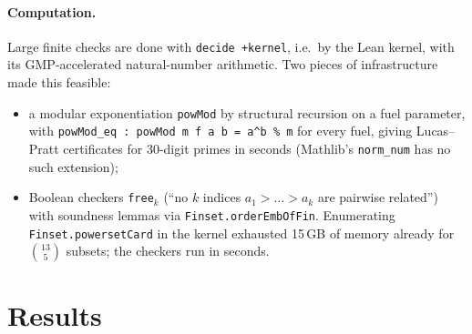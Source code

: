 \documentclass[11pt,a4paper]{article}
\newcommand{\lean}[1]{\texttt{#1}}
\begin{document}
\paragraph{Computation.} Large finite checks are done with \lean{decide +kernel}, i.e.\ by the
Lean kernel, with its GMP-accelerated natural-number arithmetic. Two pieces of infrastructure
made this feasible:
\begin{itemize}
\item a modular exponentiation \lean{powMod} by structural recursion on a fuel parameter, with
  \lean{powMod\_eq : powMod m f a b = a\^{}b \% m} for every fuel, giving Lucas--Pratt
  certificates for 30-digit primes in seconds (Mathlib's \lean{norm\_num} has no such
  extension);
\item Boolean checkers \lean{free$_k$} (``no $k$ indices $a_1>\dots>a_k$ are pairwise related'')
  with soundness lemmas via \lean{Finset.orderEmbOfFin}. Enumerating
  \lean{Finset.powersetCard} in the kernel exhausted 15\,GB of memory already for
  $\binom{13}{5}$ subsets; the checkers run in seconds.
\end{itemize}

\section{Results}
\end{document}
